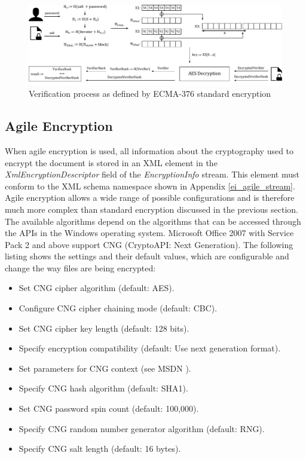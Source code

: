 \documentclass[11pt,oneside]{fithesis2}
\begin{document}
\begin{figure}[ht]
	\centering
	\includegraphics[width=1\textwidth]{figures/standard_encryption_scheme.pdf}
	\caption{Verification process as defined by ECMA-376 standard encryption}
	\label{standard_encryption_scheme}
\end{figure}

\subsection{Agile Encryption}

When agile encryption is used, all information about the cryptography used to encrypt the document is stored in an XML element in the \textit{XmlEncryptionDescriptor} field of the \textit{EncryptionInfo} stream. This element must conform to the XML schema namespace shown in Appendix \ref{ei_agile_stream}. Agile encryption allows a wide range of possible configurations and is therefore much more complex than standard encryption discussed in the previous section. The available algorithms depend on the algorithms that can be accessed through the APIs in the Windows operating system. Microsoft Office 2007 with Service Pack 2 and above support CNG (CryptoAPI: Next Generation). The following listing shows the settings and their default values, which are configurable and change the way files are being encrypted:

\begin{itemize}
\setlength\itemsep{0.1em}
	\item{Set CNG cipher algorithm (default: AES).}
	\item{Configure CNG cipher chaining mode (default: CBC).}
	\item{Set CNG cipher key length (default: 128 bits).}
	\item{Specify encryption compatibility (default: Use next generation format).}
	\item{Set parameters for CNG context (see MSDN \cite{cng_functions}).}	
	\item{Specify CNG hash algorithm (default: SHA1).}
	\item{Set CNG password spin count (default: 100,000).}
	\item{Specify CNG random number generator algorithm (default: RNG).}
	\item{Specify CNG salt length (default: 16 bytes).}
\end{itemize}
\end{document}
